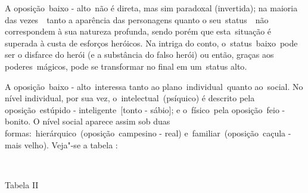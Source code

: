 A oposição~{baixo - alto}~não é direta, mas sim paradoxal (invertida);
na maioria das vezes~~tanto a aparência das personagens quanto o
seu~{status}~~não correspondem à sua natureza profunda, sendo porém que
esta~situação é superada à custa de esforços heróicos. Na intriga do
conto, o~{status}~{baixo}~pode ser o disfarce do herói (e a substância
do falso herói) ou então, graças aos poderes~{mágicos}, pode se
transformar no final em um~{status alto}.

A oposição~{baixo - alto}~interessa tanto ao plano~{individual}~quanto
ao~{social}. No nível individual, por sua vez,
o~{intelectual}~(psíquico) é descrito pela oposição~{estúpido -
inteligente}~{[}tonto - sábio{]}; e o~{físico}~pela oposição~{feio -
bonito}. O nível social aparece assim sob duas
formas:~{hierárquico}~(oposição~{campesino - real})
e~{familiar}~(oposição~{caçula - mais velho}). Veja"-se a tabela :

~

Tabela II



~

~

